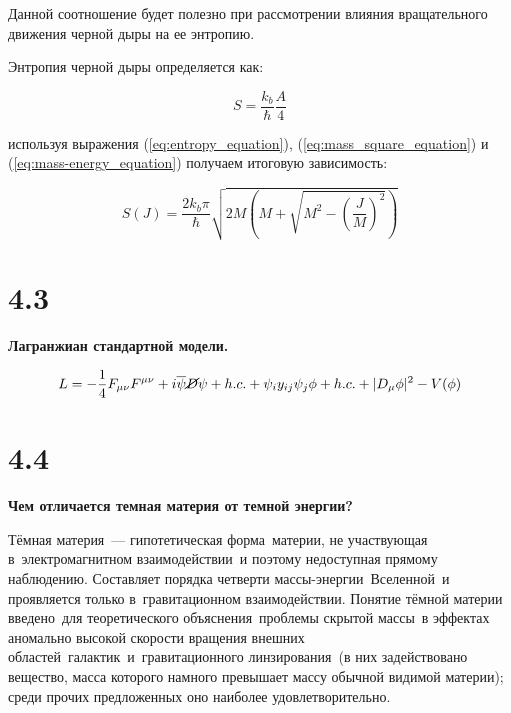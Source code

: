 \documentclass[a4paper,14pt]{article}
\begin{document}
Данной соотношение будет полезно при рассмотрении влияния вращательного движения черной дыры на ее энтропию.

Энтропия черной дыры определяется как:

\begin{equation}
S = \frac{k_{b}}{\hbar}\frac{A}{4}
\label{eq:entropy_equation}
\end{equation}


используя выражения (\ref{eq:entropy_equation}), (\ref{eq:mass_square_equation}) и (\ref{eq:mass-energy_equation}) получаем итоговую зависимость:

\begin{equation}
S\left(J\right) = \frac{2k_{b}\pi}{\hbar}\sqrt{2M\left(M + \sqrt{M^{2} - \left(\frac{J}{M}\right)^{2}}\right)}
\end{equation}

\section*{4.3}

\begin{center}
	\LARGE{\textbf{Лагранжиан стандартной модели.}}\\
\end{center}

\begin{equation*}
L = -\frac{1}{4} F_{\mu \nu} F^{\mu \nu} + i \overline{\psi} \cancel D \psi + h.c. + \psi_{i} y_{ij} \psi_{j} \phi + h.c. + |D_{\mu} \phi |^2 - V(\phi )
\end{equation*}

\section*{4.4}

\begin{center}
	\LARGE{\textbf{Чем отличается темная материя от темной энергии?}}\\
\end{center}

Тёмная материя — гипотетическая форма материи, не участвующая в электромагнитном взаимодействии и поэтому недоступная прямому наблюдению. Составляет порядка четверти массы-энергии Вселенной и проявляется только в гравитационном взаимодействии. Понятие тёмной материи введено для теоретического объяснения проблемы скрытой массы в эффектах аномально высокой скорости вращения внешних областей галактик и гравитационного линзирования (в них задействовано вещество, масса которого намного превышает массу обычной видимой материи); среди прочих предложенных оно наиболее удовлетворительно.\\
\end{document}
